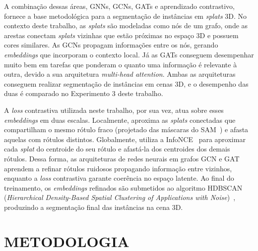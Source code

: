 A combinação dessas áreas, GNNs, GCNs, GATs e aprendizado contrastivo, fornece a base metodológica para a segmentação de instâncias em \emph{splats} 3D. No contexto deste trabalho, as \emph{splats} são modeladas como nós de um grafo, onde as arestas conectam \emph{splats} vizinhas que estão próximas no espaço 3D e possuem cores similares. As GCNs propagam informações entre os nós, gerando \textit{embeddings} que incorporam o contexto local. Já as GATs conseguem desempenhar muito bem em tarefas que ponderam o quanto uma informação é relevante à outra, devido a sua arquitetura \textit{multi-head attention}. Ambas as arquiteturas conseguem realizar segmentação de instâncias em cenas 3D, e o desempenho das duas é comparado no Experimento 3 deste trabalho.

A \emph{loss} contrastiva utilizada neste trabalho, por sua vez, atua sobre esses \textit{embeddings} em duas escalas. Localmente, aproxima as \emph{splats} conectadas que compartilham o mesmo rótulo fraco (projetado das máscaras do SAM~\cite{kirillov2023segment}) e afasta aquelas com rótulos distintos. Globalmente, utiliza a InfoNCE~\cite{oord2018representation} para aproximar cada \emph{splat} do centroide do seu rótulo e afastá-la dos centroides dos demais rótulos. Dessa forma, as arquiteturas de redes neurais em grafos GCN e GAT aprendem a refinar rótulos ruidosos propagando informação entre vizinhos, enquanto a \emph{loss} contrastiva garante coerência no espaço latente. Ao final do treinamento, os \textit{embeddings} refinados são submetidos ao algoritmo HDBSCAN (\textit{Hierarchical Density-Based Spatial Clustering of Applications with Noise})~\cite{campello2015hierarchical}, produzindo a segmentação final das instâncias na cena 3D.

\chapter{METODOLOGIA}

